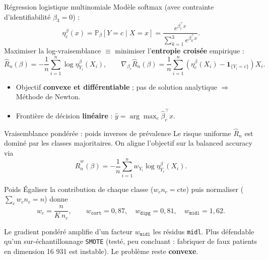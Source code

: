 \documentclass[aspectratio=169, 10pt]{beamer}
\begin{document}
\begin{frame}{Régression logistique multinomiale}
  Modèle softmax (avec contrainte d’identifiabilité $\beta_3 = 0$) :
  \[
    \eta_c^\beta(x) = \mathbb{P}_\beta[Y = c \mid X = x] = \frac{e^{\beta_c^\top x}}{\sum_{k=1}^3 e^{\beta_k^\top x}}.
  \]
  Maximiser la log-vraisemblance $\equiv$ minimiser l’\textbf{entropie croisée} empirique :
  \[
    \hat{R}_n(\beta) = -\frac{1}{n} \sum_{i=1}^n \log \eta_{Y_i}^\beta(X_i), \qquad \nabla_{\beta_c} \hat{R}_n(\beta) = \frac{1}{n} \sum_{i=1}^n \left( \eta_c^\beta(X_i) - \mathbf{1}_{\{Y_i = c\}} \right) X_i.
  \]
  \begin{itemize}
    \item Objectif \textbf{convexe et différentiable} ; pas de solution analytique $\Rightarrow$ Méthode de Newton.
    \item Frontière de décision \textbf{linéaire} : $\hat{y} = \arg\max_c \hat{\beta}_c^\top x$.
  \end{itemize}
\end{frame}

\begin{frame}{Vraisemblance pondérée : poids inverses de prévalence}
  Le risque uniforme $\hat{R}_n$ est dominé par les classes majoritaires. On aligne l’objectif sur la balanced accuracy via
  \[
    \hat{R}_n^w(\beta) = -\frac{1}{n}\sum_{i=1}^n w_{Y_i} \log \eta_{Y_i}^\beta(X_i).
  \]

  \vspace{5pt}
  \begin{block}{Poids}
    Égaliser la contribution de chaque classe ($w_c n_c = \text{cte}$) puis normaliser ($\sum_c w_c n_c = n$) donne
    \[
      w_c = \frac{n}{K\,n_c}, \qquad w_{\texttt{cort}} = 0{,}87, \quad w_{\texttt{dipg}} = 0{,}81, \quad w_{\texttt{midl}} = 1{,}62.
    \]
  \end{block}

  \bigskip
  Le gradient pondéré amplifie d’un facteur $w_{\texttt{midl}}$ les résidus \texttt{midl}. Plus défendable qu’un sur-échantillonnage \texttt{SMOTE} (testé, peu concluant : fabriquer de faux patients en dimension 16 931 est instable). Le problème reste \textbf{convexe}.
\end{frame}
\end{document}
